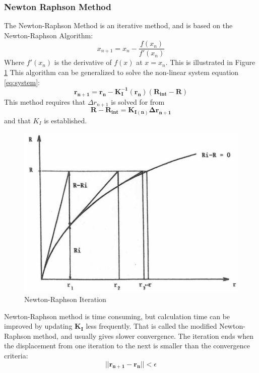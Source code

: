 \subsubsection{Newton Raphson Method}
\label{sec:newton}
The Newton-Raphson Method is an iterative method, and is based on the Newton-Raphson Algorithm:
\begin{equation}
    x_{n+1}=x_n - \frac{f(x_n)}{f'(x_n)}
\end{equation}
 Where $f'(x_n)$ is the derivative of $f(x)$ at $x=x_n$. This is illustrated in Figure \ref{fig:newton}
 \noindent This algorithm can be generalized to solve the non-linear system equation \ref{eq:system}:
 \begin{equation}
  \boldsymbol{r_{n+1}}= \boldsymbol{r_n-K_I^{-1}(r_n)(R_{int}-R)} 
\end{equation}
This method requires that $\Delta r_{n+1}$ is solved for from 
\begin{equation}
   \boldsymbol{R-R_{int}}=\boldsymbol{K_{I(n)}\Delta r_{n+1}}
   \label{eq:newton}
\end{equation}
and that $K_I$ is established. 
 \begin{figure}[H]
\centering
\includegraphics[scale=0.5]{figures/newton2}
\caption[$\; \:$Newton-Raphson Iteration]{Newton-Raphson Iteration \cite{moan2003} }
 \label{fig:newton}
\end{figure}
\noindent Newton-Raphson method is time consuming, but calculation time can be improved by updating $\boldsymbol{K_I}$ less frequently. That is called the modified Newton-Raphson method, and usually gives slower convergence.  The iteration ends when the displacement from one iteration to the next is smaller than the convergence criteria:
\begin{equation}
    ||\boldsymbol{r_{n+1}-r_n||} < \epsilon
\end{equation}

